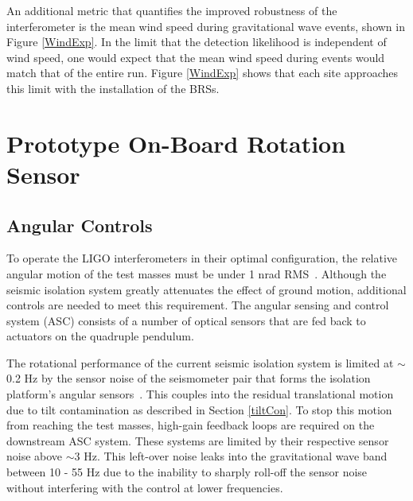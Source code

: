 \documentclass [12pt, proquest]{uwthesis}[2019]
\begin{document}
An additional metric that quantifies the improved robustness of the interferometer is the mean wind speed during gravitational wave events, shown in Figure \ref{WindExp}. In the limit that the detection likelihood is independent of wind speed, one would expect that the mean wind speed during events would match that of the entire run. Figure \ref{WindExp} shows that each site approaches this limit with the installation of the BRSs. 



\chapter{Prototype On-Board Rotation Sensor}\label{cBRS_chap}
\section{Angular Controls}\label{ASC}

To operate the LIGO interferometers in their optimal configuration, the relative angular motion of the test masses must be under 1 nrad RMS~\cite{ASC}. Although the seismic isolation system greatly attenuates the effect of ground motion, additional controls are needed to meet this requirement. The angular sensing and control system (ASC) consists of a number of optical sensors that are fed back to actuators on the quadruple pendulum.~\cite{ASC}

The rotational performance of the current seismic isolation system is limited at $\sim$0.2 Hz by the sensor noise of the seismometer pair that forms the isolation platform's angular sensors~\cite{windproofing}. This couples into the residual translational motion due to tilt contamination as described in Section \ref{tiltCon}. To stop this motion from reaching the test masses, high-gain feedback loops are required on the downstream ASC system. These systems are limited by their respective sensor noise above $\sim$3 Hz. This left-over noise leaks into the gravitational wave band between 10 - 55 Hz due to the inability to sharply roll-off the sensor noise without interfering with the control at lower frequencies. 
\end{document}
